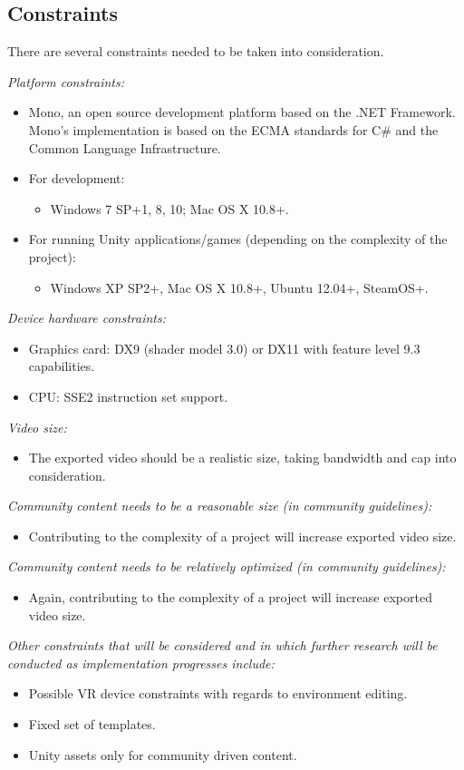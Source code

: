 \documentclass{article}
\begin{document}
\subsection{Constraints}
There are several constraints needed to be taken into consideration.
\bigskip
\begin{flushleft}
\textsl{Platform constraints:}
\end{flushleft}
	\begin{itemize}
		\item Mono, an open source development platform based on the .NET Framework. Mono’s implementation is based on the ECMA standards for C\# and the Common Language Infrastructure.
		\item For development:
			\begin{itemize}
				\item Windows 7 SP+1, 8, 10; Mac OS X 10.8+.
			\end{itemize}
		\item For running Unity applications/games (depending on the complexity of the project):
			\begin{itemize}
				\item Windows XP SP2+, Mac OS X 10.8+, Ubuntu 12.04+, SteamOS+.
			\end{itemize}
	\end{itemize}
\medskip
\textsl{Device hardware constraints:}
	\begin{itemize}
		\item Graphics card: DX9 (shader model 3.0) or DX11 with feature level 9.3 capabilities.
		\item CPU: SSE2 instruction set support.
	\end{itemize}
\medskip
\textsl{Video size:}
	\begin{itemize}
		\item The exported video should be a realistic size, taking bandwidth and cap into consideration.
	\end{itemize}
\medskip
\textsl{Community content needs to be a reasonable size (in community guidelines):}
	\begin{itemize}
		\item Contributing to the complexity of a project will increase exported video size.
	\end{itemize}
\medskip
\textsl{Community content needs to be relatively optimized (in community guidelines):}
	\begin{itemize}
		\item Again, contributing to the complexity of a project will increase exported video size.
	\end{itemize}
\medskip
\textsl{Other constraints that will be considered and in which further research will be conducted as implementation progresses include:}
	\begin{itemize}
		\item Possible VR device constraints with regards to environment editing.
		\item Fixed set of templates.
		\item Unity assets only for community driven content.
	\end{itemize}
\end{document}
